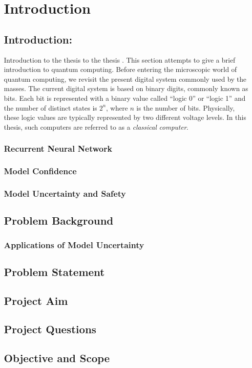 \chapter{Introduction}
\label{chap:intro}
\section{Introduction: }
Introduction to the thesis \cite{b2} to the thesis \cite{okamoto2004improved}. This section attempts to give a brief introduction to quantum computing. Before entering the microscopic world of quantum computing, we revisit the present digital system commonly used by the masses.  The current digital system is based on binary digits, commonly known as bits.  Each bit is represented with a binary value called ``logic 0'' or ``logic 1'' and the number of distinct states is $2^n$, where $n$ is the number of bits.  Physically, these logic values are typically represented by two different voltage levels. In this thesis, such computers are referred to as a \emph{classical computer}.
\subsection{Recurrent Neural Network}
\subsection{Model Confidence}
\subsection{Model Uncertainty and Safety}

\section{Problem Background}
\subsection{Applications of Model Uncertainty}

\section{Problem Statement}

\section{Project Aim}

\section{Project Questions}

\section{Objective and Scope}

